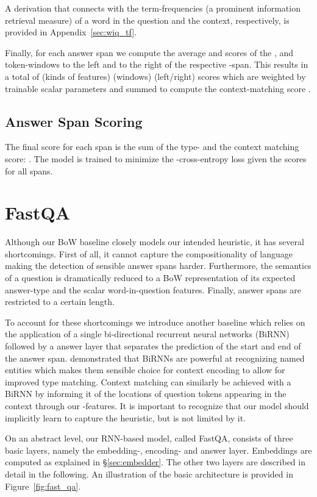 \documentclass[11pt,a4paper]{article}
\begin{document}
A derivation that connects  with the term-frequencies (a prominent information retrieval measure) of a word in the question and the context, respectively, is provided in Appendix~\ref{sec:wiq_tf}. 


Finally, for each answer span  we compute the average  and  scores of the ,  and  token-windows to the left and to the right of the respective -span. This results in a total of  (kinds of features) (windows) (left/right)  scores which are weighted by trainable scalar parameters and summed to compute the context-matching score .

\subsection{Answer Span Scoring}

The final score  for each span  is the sum of the type- and the context matching score: . The model is trained to minimize the -cross-entropy loss given the scores for all spans.

\section{FastQA}

Although our BoW baseline closely models our intended heuristic, it has several shortcomings. First of all, it cannot capture the compositionality of language making the detection of sensible answer spans harder. Furthermore, the semantics of a question is dramatically reduced to a BoW representation of its expected answer-type and the scalar word-in-question features. Finally, answer spans are restricted to a certain length.

To account for these shortcomings we introduce another baseline which relies on the application of a single bi-directional recurrent neural networks (BiRNN) followed by a answer layer that separates the prediction of the start and end of the answer span.  demonstrated that BiRNNs are powerful at recognizing named entities which makes them sensible choice for context encoding to allow for improved type matching. Context matching can similarly be achieved with a BiRNN by informing it of the locations of question tokens appearing in the context through our -features. It is important to recognize that our model should implicitly learn to capture the heuristic, but is not limited by it.

On an abstract level, our RNN-based model, called FastQA, consists of three basic layers, namely the embedding-, encoding- and answer layer. Embeddings are computed as explained in \S\ref{sec:embedder}. The other two layers are described in detail in the following. An illustration of the basic architecture is provided in Figure~\ref{fig:fast_qa}.
\end{document}
